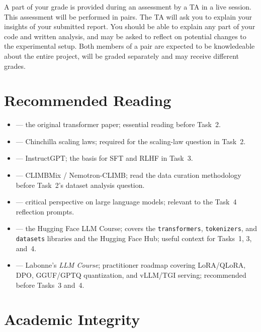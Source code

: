 A part of your grade is provided during an assessment by a TA in a live session. This assessment will be performed in pairs. The TA will ask you to explain your insights of your submitted report. You should be able to explain any part of your code and written analysis, and may be asked to reflect on potential changes to the experimental setup. Both members of a pair are expected to be knowledeable about the entire project, will be graded separately and may receive different grades.

\section{Recommended Reading}
\label{sec:reading}

\begin{itemize}
    \item \citet{vaswani2017attention} --- the original transformer paper; essential reading before Task~2.
    \item \citet{10.5555/3600270.3602446} --- Chinchilla scaling laws; required for the scaling-law question in Task~2.
    \item \citet{ouyang2022training} --- InstructGPT; the basis for SFT and RLHF in Task~3.
    \item \citet{diao2025nemotronclimb} --- CLIMBMix / Nemotron-CLIMB; read the data curation methodology before Task~2's dataset analysis question.
    \item \citet{bender2021dangers} --- critical perspective on large language models; relevant to the Task~4 reflection prompts.
    \item \citet{huggingface2022course} --- the Hugging Face LLM Course; covers the \texttt{transformers}, \texttt{tokenizers}, and \texttt{datasets} libraries and the Hugging Face Hub; useful context for Tasks~1, 3, and~4.
    \item \citet{labonne2023llmcourse} --- Labonne's \textit{LLM Course}; practitioner roadmap covering LoRA/QLoRA, DPO, GGUF/GPTQ quantization, and vLLM/TGI serving; recommended before Tasks~3 and~4.
\end{itemize}

\section{Academic Integrity}
\label{sec:integrity}

